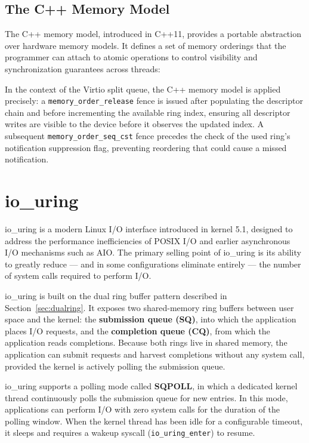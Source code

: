 \documentclass[12pt, a4paper, oneside]{report}
\begin{document}
\subsection{The C++ Memory Model}

The C++ memory model, introduced in C++11, provides a portable abstraction over
hardware memory models.  It defines a set of memory orderings that the programmer
can attach to atomic operations to control visibility and synchronization
guarantees across threads:

In the context of the Virtio split queue, the C++ memory model is applied
precisely: a \texttt{memory\_order\_release} fence is issued after populating
the descriptor chain and before incrementing the available ring index, ensuring
all descriptor writes are visible to the device before it observes the updated
index.  A subsequent \texttt{memory\_order\_seq\_cst} fence precedes the check
of the used ring's notification suppression flag, preventing reordering that
could cause a missed notification.



\section{io\_uring}
\label{sec:iouring}

io\_uring is a modern Linux I/O interface introduced in kernel 5.1, designed to
address the performance inefficiencies of POSIX I/O and earlier asynchronous I/O
mechanisms such as AIO.  The primary selling point of io\_uring is its ability
to greatly reduce --- and in some configurations eliminate entirely --- the
number of system calls required to perform I/O.

io\_uring is built on the dual ring buffer pattern described in
Section~\ref{sec:dualring}.  It exposes two shared-memory ring buffers between
user space and the kernel: the \textbf{submission queue (SQ)}, into which the
application places I/O requests, and the \textbf{completion queue (CQ)}, from
which the application reads completions.  Because both rings live in shared
memory, the application can submit requests and harvest completions without any
system call, provided the kernel is actively polling the submission queue.

io\_uring supports a polling mode called \textbf{SQPOLL}, in which a dedicated
kernel thread continuously polls the submission queue for new entries.  In this
mode, applications can perform I/O with zero system calls for the duration of the
polling window.  When the kernel thread has been idle for a configurable timeout,
it sleeps and requires a wakeup syscall (\texttt{io\_uring\_enter}) to resume.
\end{document}
